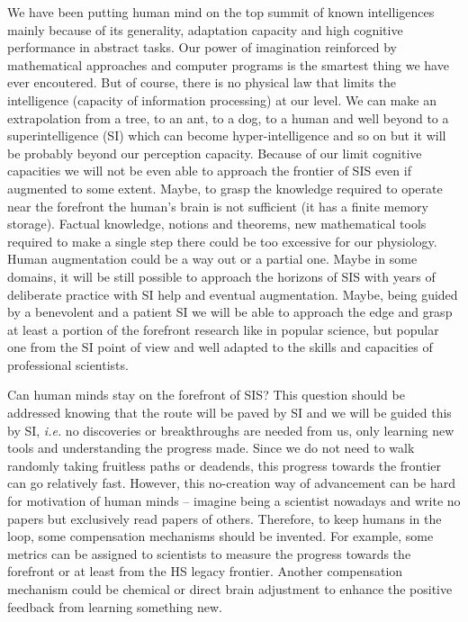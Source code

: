 \documentclass[a4paper,11pt]{article}
\begin{document}
        We have been putting human mind on the top summit of known intelligences mainly because of its generality, adaptation capacity and high cognitive performance in abstract tasks. Our power of imagination reinforced by mathematical approaches and computer programs is the smartest thing we have ever encoutered. But of course, there is no physical law that limits the intelligence (capacity of information processing) at our level. We can make an extrapolation from a tree, to an ant, to a dog, to a human and well beyond to a superintelligence (SI) which can become hyper-intelligence and so on but it will be probably beyond our perception capacity. Because of our limit cognitive capacities we will not be even able to approach the frontier of SIS even if augmented to some extent. Maybe, to grasp the knowledge required to operate near the forefront the human's brain is not sufficient (it has a finite memory storage). Factual knowledge, notions and theorems, new mathematical tools required to make a single step there could be too excessive for our physiology. Human augmentation could be a way out or a partial one. Maybe in some domains, it will be still possible to approach the horizons of SIS with years of deliberate practice with SI help and eventual augmentation. Maybe, being guided by a benevolent and a patient SI we will be able to approach the edge and grasp at least a portion of the forefront research like in popular science, but popular one from the SI point of view and well adapted to the skills and capacities of professional scientists.

        Can human minds stay on the forefront of SIS? This question should be addressed knowing that the route will be paved by SI and we will be guided this by SI, \emph{i.e.} no discoveries or breakthroughs are needed from us, only learning new tools and understanding the progress made. Since we do not need to walk randomly taking fruitless paths or deadends, this progress towards the frontier can go relatively fast. However, this no-creation way of advancement can be hard for motivation of human minds -- imagine being a scientist nowadays and write no papers but exclusively read papers of others. Therefore, to keep humans in the loop, some compensation mechanisms should be invented. For example, some metrics can be assigned to scientists to measure the progress towards the forefront or at least from the HS legacy frontier. Another compensation mechanism could be chemical or direct brain adjustment to enhance the positive feedback from learning something new.
        
\end{document}
